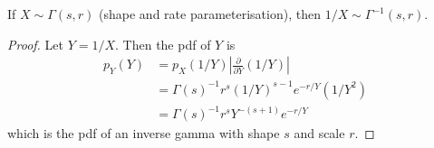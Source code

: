 \begin{lemma}
  If $X\sim\Gamma(s,r)$ (shape and rate parameterisation), then $1/X \sim \Gamma^{-1}(s,r)$.
\end{lemma}

\begin{proof}
  Let $Y=1/X$.
  Then the pdf of $Y$ is
  \begingroup
  \setlength{\abovedisplayskip}{8pt}
  \setlength{\belowdisplayskip}{5pt}  
  \begin{align*}
    p_Y(Y) 
    &= p_X(1/Y) \left\vert \frac{\partial}{\partial Y} (1/Y) \right\vert \\
    &= \Gamma(s)^{-1} r^s (1/Y)^{s-1} e^{-r/Y} (1/Y^2) \\
    &= \Gamma(s)^{-1} r^s Y^{-(s+1)} e^{-r/Y}
  \end{align*}
  \endgroup  
  which is the pdf of an inverse gamma with shape $s$ and scale $r$.
\end{proof}



